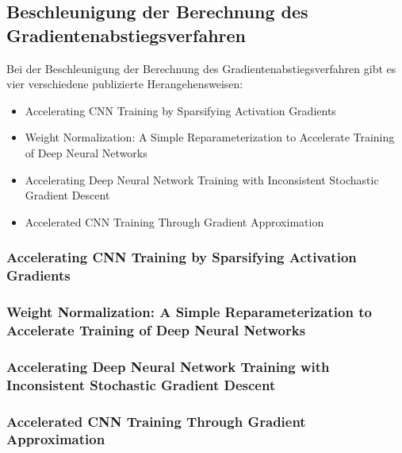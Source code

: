 \subsection{Beschleunigung der Berechnung des Gradientenabstiegsverfahren}
Bei der Beschleunigung der Berechnung des Gradientenabstiegsverfahren gibt es vier verschiedene publizierte Herangehensweisen:
\begin{itemize}
 \item Accelerating CNN Training by Sparsifying Activation Gradients
 \item Weight Normalization: A Simple Reparameterization
to Accelerate Training of Deep Neural Networks
 \item Accelerating Deep Neural Network Training with Inconsistent Stochastic Gradient Descent
 \item Accelerated CNN Training Through Gradient Approximation 
\end{itemize}


\subsubsection{Accelerating CNN Training by Sparsifying Activation Gradients}

\subsubsection{Weight Normalization: A Simple Reparameterization
to Accelerate Training of Deep Neural Networks}




\subsubsection{Accelerating Deep Neural Network Training with Inconsistent Stochastic Gradient Descent}



\subsubsection{Accelerated CNN Training Through Gradient Approximation }


